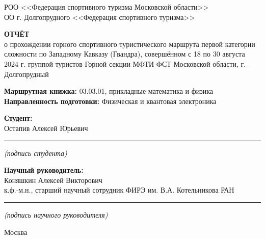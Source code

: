 \begin{titlepage}

	\begin{center}
		РОО <<Федерация спортивного туризма Московской области>>\\
		ОО г. Долгопрудного <<Федерация спортивного туризма>>\\
	\end{center}

	
	
	\begin{center}
		\Large{\bfseries{ОТЧЁТ}} \\
		\normalsize о прохождении горного спортивного туристического маршрута первой категории сложности по Западному Кавказу (Гвандра), совершённом с 18 по 30 августа 2024 г. группой туристов Горной секции МФТИ ФСТ Московской области, г. Долгопрудный
	\end{center}
	\vspace{1.8 cm}
	
	\parskip \textbf{Маршрутная книжка:} 03.03.01, прикладные математика и физика \\ 
	\textbf{Направленность подготовки:} Физическая и квантовая электроника
	\vspace{3 cm}
	
	\null\hfill
	\begin{minipage}{0.5\textwidth}
		\begin{flushleft} \large
			\textbf{Студент:} \\
			Остапив Алексей Юрьевич
			\vspace{0.5 cm}
			\hrule
			\vspace{-0.6 em}
			\begin{center}
				\small \textit{(подпись студента)} \\
			\end{center}
			
			\vspace{-0.4 em}
			\large
			\textbf{Научный руководитель:} \\
			Коняшкин Алексей Викторович \\
			к.ф.-м.н., старший научный сотрудник ФИРЭ им. В.А. Котельникова РАН 
			\vspace{0.5 cm}
			\hrule
			\vspace{-0.6 em}
			\begin{center}
				\small \textit{(подпись научного руководителя)} \\
			\end{center}
			
		\end{flushleft}
	\end{minipage}
	
	\vfill
	\vfill
	\begin{center}
		Москва   \the\year{}
	\end{center}
	
\end{titlepage}